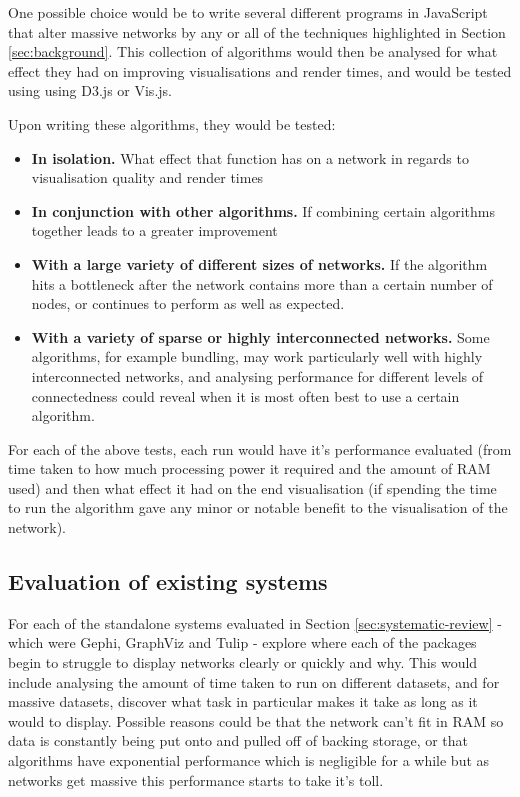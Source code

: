 \documentclass[../dissertation.tex]{subfiles}
\begin{document}
One possible choice would be to write several different programs in JavaScript that alter massive networks by any or all of the techniques highlighted in Section \ref{sec:background}. This collection of algorithms would then be analysed for what effect they had on improving visualisations and render times, and would be tested using using D3.js or Vis.js. 

Upon writing these algorithms, they would be tested:
\begin{itemize}
    \item \textbf{In isolation.} What effect that function has on a network in regards to visualisation quality and render times
    \item \textbf{In conjunction with other algorithms.} If combining certain algorithms together leads to a greater improvement
    \item\textbf{ With a large variety of different sizes of networks.} If the algorithm hits a bottleneck after the network contains more than a certain number of nodes, or continues to perform as well as expected.
    \item \textbf{With a variety of sparse or highly interconnected networks.} Some algorithms, for example bundling, may work particularly well with highly interconnected networks, and analysing performance for different levels of connectedness could reveal when it is most often best to use a certain algorithm.
\end{itemize}

For each of the above tests, each run would have it's performance evaluated (from time taken to how much processing power it required and the amount of RAM used) and then what effect it had on the end visualisation (if spending the time to run the algorithm gave any minor or notable benefit to the visualisation of the network).

\subsection{Evaluation of existing systems}

For each of the standalone systems evaluated in Section \ref{sec:systematic-review} - which were Gephi, GraphViz and Tulip - explore where each of the packages begin to struggle to display networks clearly or quickly and why. This would include analysing the amount of time taken to run on different datasets, and for massive datasets, discover what task in particular makes it take as long as it would to display. Possible reasons could be that the network can't fit in RAM so data is constantly being put onto and pulled off of backing storage, or that algorithms have exponential performance which is negligible for a while but as networks get massive this performance starts to take it's toll. 
\end{document}
